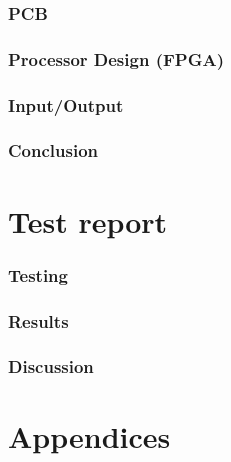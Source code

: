 \documentclass{report}
\begin{document}
\section{PCB}
	

\section{Processor Design (FPGA)}
	

\section{Input/Output}
	

\section{Conclusion}

\part{Test report}

\section{Testing}
	

\section{Results}
	

\section{Discussion}
	

\part{Appendices}
	



\nocite{*}
\end{document}

